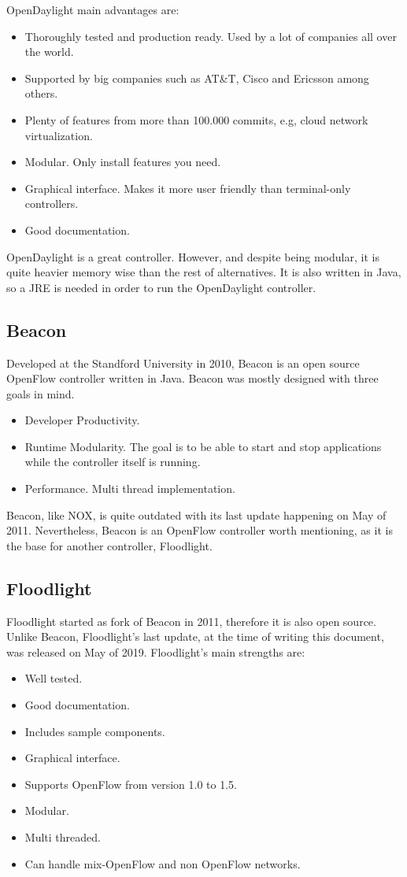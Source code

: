 OpenDaylight main advantages are:
\begin{itemize}
    \item Thoroughly tested and production ready. Used by a lot of companies all over the world.
    \item Supported by big companies such as AT\&T, Cisco and Ericsson among others.
    \item Plenty of features from more than 100.000 commits, e.g, cloud network virtualization.
    \item Modular. Only install features you need.
    \item Graphical interface. Makes it more user friendly than terminal-only controllers.
    \item Good documentation.
\end{itemize}

OpenDaylight is a great controller. However, and despite being modular, it is quite heavier memory wise than the rest of alternatives. It is also written in Java, so a JRE is needed in order to run the OpenDaylight controller. 

\subsection{Beacon}
Developed at the Standford University in 2010, Beacon\cite{beacon} is an open source OpenFlow controller written in Java. Beacon was mostly designed with three goals in mind.
\begin{itemize}
    \item Developer Productivity.
    \item Runtime Modularity. The goal is to be able to start and stop applications while the controller itself is running.
    \item Performance. Multi thread implementation.
\end{itemize}

Beacon, like NOX, is quite outdated with its last update happening on May of 2011. Nevertheless, Beacon is an OpenFlow controller worth mentioning, as it is the base for another controller, Floodlight.

\subsection{Floodlight}
Floodlight started as fork of Beacon in 2011, therefore it is also open source. Unlike Beacon, Floodlight's last update, at the time of writing this document, was released on May of 2019. Floodlight's main strengths are:
\begin{itemize}
    \item Well tested.
    \item Good documentation.
    \item Includes sample components.
    \item Graphical interface.
    \item Supports OpenFlow from version 1.0 to 1.5.
    \item Modular.
    \item Multi threaded. 
    \item Can handle mix-OpenFlow and non OpenFlow networks.
\end{itemize}

